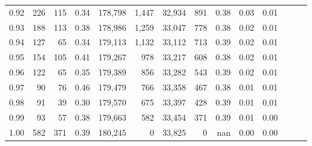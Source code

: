 \begin{tabular}{rrrrrrrrrrrrrr}
0.92 &    226 &  115 &  0.34 &  178,798 &    1,447 &  32,934 &     891 &  0.38 &  0.03 &      0.01 \\
0.93 &    188 &  113 &  0.38 &  178,986 &    1,259 &  33,047 &     778 &  0.38 &  0.02 &      0.01 \\
0.94 &    127 &   65 &  0.34 &  179,113 &    1,132 &  33,112 &     713 &  0.39 &  0.02 &      0.01 \\
0.95 &    154 &  105 &  0.41 &  179,267 &      978 &  33,217 &     608 &  0.38 &  0.02 &      0.01 \\
0.96 &    122 &   65 &  0.35 &  179,389 &      856 &  33,282 &     543 &  0.39 &  0.02 &      0.01 \\
0.97 &     90 &   76 &  0.46 &  179,479 &      766 &  33,358 &     467 &  0.38 &  0.01 &      0.01 \\
0.98 &     91 &   39 &  0.30 &  179,570 &      675 &  33,397 &     428 &  0.39 &  0.01 &      0.01 \\
0.99 &     93 &   57 &  0.38 &  179,663 &      582 &  33,454 &     371 &  0.39 &  0.01 &      0.00 \\
1.00 &    582 &  371 &  0.39 &  180,245 &        0 &  33,825 &       0 &   nan &  0.00 &      0.00 \\
\bottomrule
\end{tabular}
